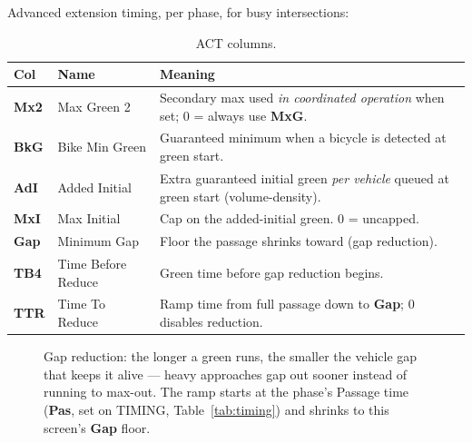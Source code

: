 \documentclass[11pt]{article}
\newcommand{\field}[1]{\textsf{\textbf{#1}}}
\newcommand{\screen}[1]{\textsc{#1}}
\begin{document}
Advanced extension timing, per phase, for busy intersections:

\begin{table}[H]
\centering\small
\begin{tabular}{@{}llp{9.2cm}@{}}
\toprule
\textbf{Col} & \textbf{Name} & \textbf{Meaning} \\
\midrule
\field{Mx2} & Max Green 2      & Secondary max used \emph{in coordinated operation} when set;
                                 0 = always use \field{MxG}. \\
\field{BkG} & Bike Min Green   & Guaranteed minimum when a bicycle is detected at green start. \\
\field{AdI} & Added Initial    & Extra guaranteed initial green \emph{per vehicle} queued at
                                 green start (volume-density). \\
\field{MxI} & Max Initial      & Cap on the added-initial green. 0 = uncapped. \\
\field{Gap} & Minimum Gap      & Floor the passage shrinks toward (gap reduction). \\
\field{TB4} & Time Before Reduce & Green time before gap reduction begins. \\
\field{TTR} & Time To Reduce   & Ramp time from full passage down to \field{Gap};
                                 0 disables reduction. \\
\bottomrule
\end{tabular}
\caption{\screen{ACT} columns.}
\label{tab:act}
\end{table}

\begin{figure}[H]
\centering
{}
\caption{Gap reduction: the longer a green runs, the smaller the vehicle gap that
keeps it alive — heavy approaches gap out sooner instead of running to max-out.
The ramp starts at the phase's Passage time (\field{Pas}, set on \screen{TIMING},
Table~\ref{tab:timing}) and shrinks to this screen's \field{Gap} floor.}
\label{fig:gapred}
\end{figure}
\end{document}
